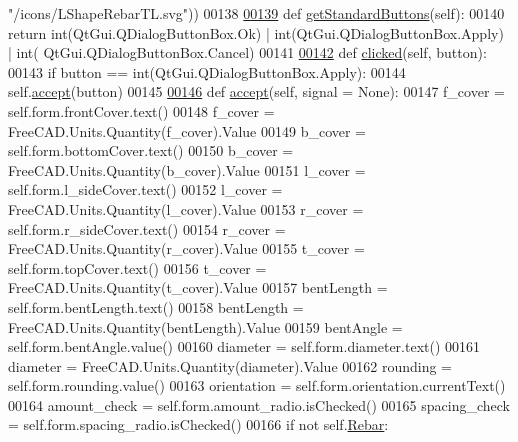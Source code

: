 \begin{DoxyCode}
{       "/icons/LShapeRebarTL.svg"))}
00138 
\hypertarget{BentShapeRebar_8py_source.tex_l00139}{}\hyperlink{classBentShapeRebar_1_1__BentShapeRebarTaskPanel_af363d8287c33547f2b7fc6f6f326d47a}{00139}     \textcolor{keyword}{def }\hyperlink{classBentShapeRebar_1_1__BentShapeRebarTaskPanel_af363d8287c33547f2b7fc6f6f326d47a}{getStandardButtons}(self):
00140         \textcolor{keywordflow}{return} int(QtGui.QDialogButtonBox.Ok) | int(QtGui.QDialogButtonBox.Apply) | int(
      QtGui.QDialogButtonBox.Cancel)
00141 
\hypertarget{BentShapeRebar_8py_source.tex_l00142}{}\hyperlink{classBentShapeRebar_1_1__BentShapeRebarTaskPanel_ae92dd6ab03c4b967b064fac00fa0d906}{00142}     \textcolor{keyword}{def }\hyperlink{classBentShapeRebar_1_1__BentShapeRebarTaskPanel_ae92dd6ab03c4b967b064fac00fa0d906}{clicked}(self, button):
00143         \textcolor{keywordflow}{if} button == int(QtGui.QDialogButtonBox.Apply):
00144             self.\hyperlink{classBentShapeRebar_1_1__BentShapeRebarTaskPanel_afdcf71c6a16711a535971366558ea918}{accept}(button)
00145 
\hypertarget{BentShapeRebar_8py_source.tex_l00146}{}\hyperlink{classBentShapeRebar_1_1__BentShapeRebarTaskPanel_afdcf71c6a16711a535971366558ea918}{00146}     \textcolor{keyword}{def }\hyperlink{classBentShapeRebar_1_1__BentShapeRebarTaskPanel_afdcf71c6a16711a535971366558ea918}{accept}(self, signal = None):
00147         f\_cover = self.form.frontCover.text()
00148         f\_cover = FreeCAD.Units.Quantity(f\_cover).Value
00149         b\_cover = self.form.bottomCover.text()
00150         b\_cover = FreeCAD.Units.Quantity(b\_cover).Value
00151         l\_cover = self.form.l\_sideCover.text()
00152         l\_cover = FreeCAD.Units.Quantity(l\_cover).Value
00153         r\_cover = self.form.r\_sideCover.text()
00154         r\_cover = FreeCAD.Units.Quantity(r\_cover).Value
00155         t\_cover = self.form.topCover.text()
00156         t\_cover = FreeCAD.Units.Quantity(t\_cover).Value
00157         bentLength = self.form.bentLength.text()
00158         bentLength = FreeCAD.Units.Quantity(bentLength).Value
00159         bentAngle = self.form.bentAngle.value()
00160         diameter = self.form.diameter.text()
00161         diameter = FreeCAD.Units.Quantity(diameter).Value
00162         rounding = self.form.rounding.value()
00163         orientation = self.form.orientation.currentText()
00164         amount\_check = self.form.amount\_radio.isChecked()
00165         spacing\_check = self.form.spacing\_radio.isChecked()
00166         \textcolor{keywordflow}{if} \textcolor{keywordflow}{not} self.\hyperlink{classBentShapeRebar_1_1__BentShapeRebarTaskPanel_aae8fd4e66d675c566d0afcee0af2341f}{Rebar}:

\end{DoxyCode}
